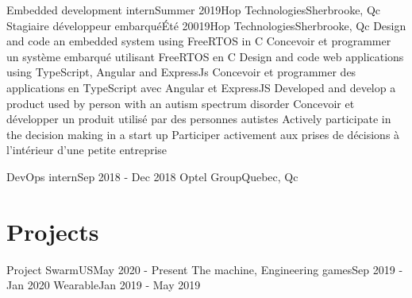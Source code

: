 \documentclass[letterpaper,11pt]{resume}
\begin{document}
    \resumeSubheadingEnFr
      {Embedded development intern}{Summer 2019}{Hop Technologies}{Sherbrooke, Qc}
      {Stagiaire développeur embarqué}{Été 20019}{Hop Technologies}{Sherbrooke, Qc}
        \resumeItemListStart
            \resumeItemEnFr
                {Design and code an embedded system using FreeRTOS in C}
                {Concevoir et programmer un système embarqué utilisant FreeRTOS en C}
            \resumeItemEnFr
                {Design and code web applications using TypeScript, Angular and ExpressJs}
                {Concevoir et programmer des applications en TypeScript avec Angular et ExpressJS}
            \resumeItemEnFr
                {Developed and develop a product used by person with an autism spectrum disorder}
                {Concevoir et développer un produit utilisé par des personnes autistes}
            \resumeItemEnFr
                {Actively participate in the decision making in a start up}
                {Participer activement aux prises de décisions à l'intérieur d'une petite entreprise}
        \resumeItemListEnd

    \resumeSubheading
      {DevOps intern}{Sep 2018 - Dec 2018}
      {Optel Group}{Quebec, Qc}
      \resumeItemListStart
      \resumeItemListEnd

    \resumeSubHeadingListEnd


\section{Projects}
    \resumeSubHeadingListStart
      \resumeProjectHeading
          {Project SwarmUS}{May 2020 - Present}
          \resumeItemListStart
          \resumeItemListEnd
      \resumeProjectHeading
          {The machine, Engineering games}{Sep 2019 - Jan 2020}
          \resumeItemListStart
          \resumeItemListEnd
      \resumeProjectHeading
          {Wearable}{Jan 2019 - May 2019}
          \resumeItemListStart
          \resumeItemListEnd
    \resumeSubHeadingListEnd
\end{document}
